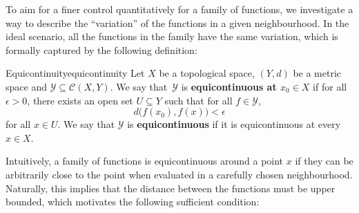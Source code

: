 \documentclass[math]{amznotes}
\theoremstyle{remark}
\begin{document}
To aim for a finer control quantitatively for a family of functions, we investigate a way to describe the ``variation'' of the functions in a given neighbourhood. In the ideal scenario, all the functions in the family have the same variation, which is formally captured by the following definition:
\begin{dfnbox}{Equicontinuity}{equicontinuity}
    Let $X$ be a topological space, $\left(Y, d\right)$ be a metric space and $\mathcal{Y} \subseteq \mathcal{C}\left(X, Y\right)$. We say that~$\mathcal{Y}$ is {\color{red} \textbf{equicontinuous at $x_0 \in X$}} if for all $\epsilon > 0$, there exists an open set $U \subseteq Y$ such that for all $f \in \mathcal{Y}$, 
    \begin{equation*}
        d\bigl(f\left(x_0\right), f\left(x\right)\bigr) < \epsilon
    \end{equation*}
    for all $x \in U$. We say that $\mathcal{Y}$ is {\color{red} \textbf{equicontinuous}} if it is equicontinuous at every $x \in X$. 
\end{dfnbox}
Intuitively, a family of functions is equicontinuous around a point $x$ if they can be arbitrarily close to the point when evaluated in a carefully chosen neighbourhood. Naturally, this implies that the distance between the functions must be upper bounded, which motivates the following sufficient condition:
\end{document}
